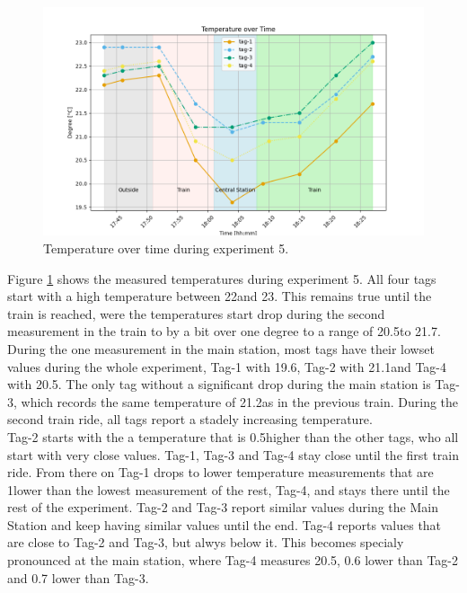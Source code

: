 \begin{figure}[ht!]
	\includegraphics[width=\linewidth]{graphics/exp/exp6_temp_plot_2.png}
	\caption{Temperature over time during experiment 5.}
	\label{f:ex5_train_temp}
\end{figure}

Figure \ref{f:ex5_train_temp} shows the measured temperatures during experiment 5.
All four tags start with a high temperature between 22\degree and 23\degree .
This remains true until the train is reached, were the temperatures start drop during the second measurement in the train to by a bit over one degree to a range of 20.5\degree to 21.7\degree .
During the one measurement in the main station, most tags have their lowset values during the whole experiment, Tag-1 with 19.6\degree , Tag-2 with 21.1\degree and Tag-4 with 20.5\degree .
The only tag without a significant drop during the main station is Tag-3, which records the same temperature of 21.2\degree as in the previous train.
During the second train ride, all tags report a stadely increasing temperature. \\
Tag-2 starts with the a temperature that is 0.5\degree higher than the other tags, who all start with very close values.
Tag-1, Tag-3 and Tag-4 stay close until the first train ride.
From there on Tag-1 drops to lower temperature measurements that are 1\degree lower than the lowest measurement of the rest, Tag-4, and stays there until the rest of the experiment.
Tag-2 and Tag-3 report similar values during the Main Station and keep having similar values until the end.
Tag-4 reports values that are close to Tag-2 and Tag-3, but alwys below it. This becomes specialy pronounced at the main station, where Tag-4 measures 20.5\degree , 0.6 \degree lower than Tag-2 and 0.7 \degree lower than Tag-3.


